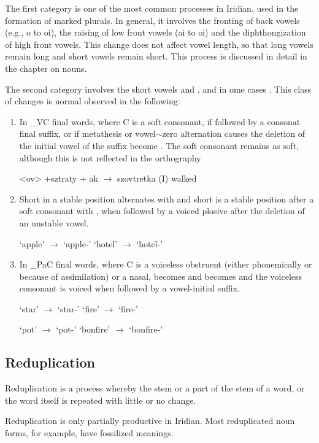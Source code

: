 The first category is one of the most common processes in Iridian, used in the formation of marked plurals. In general, it involves the fronting of back vowels (e.g., o to oi), the raising of low front vowels (ai to oi) and the diphthongization of high front vowels. This change does not affect vowel length, so that long vowels remain long and short vowels remain short. This process is discussed in detail in the chapter on nouns.

The second category involves the short vowels  and , and in ome cases . This class of changes is normal observed in the following:

\begin{enumerate}
	\item In \_VC final words, where C is a soft consonant, if followed by a consonat final suffix, or if metathesis or vowel$\sim$zero alternation causes the deletion of the initial vowel of the suffix  become . The soft consonant remains as soft, although this is not reflected in the orthography

		\pex
	\a <ov> +sztraty + ak $\rightarrow$ szovtretka (I) walked
	\xe
	\item Short  in a stable position alternates with  and short  is a stable position after a soft consonant with , when followed by a voiced plosive after the deletion of an unstable vowel.

	\pex
	\a {} `apple' $\rightarrow$  `apple-'
	\a {} `hotel' $\rightarrow$  `hotel-'
	\xe

	\item In \_PaC final words, where C is a voiceless obstruent (either phonemically or because of assimilation) or a nasal,  becomes  and  becomes  and the voiceless consonant is voiced when followed by a vowel-initial suffix.

		\pex
	\a {} `star' $\rightarrow$  `star-'
	\a {} `fire' $\rightarrow$  `fire-'
	\xe

	\pex
	\a {} `pot' $\rightarrow$  `pot-'
	\a {} `bonfire' $\rightarrow$  `bonfire-'
	\xe

\end{enumerate}



\subsection{Reduplication}
\par Reduplication is a process whereby the stem or a part of the stem of a word, or the word itself is repeated with little or no change.
\par Reduplication is only partially productive in Iridian. Most reduplicated noun forms, for example, have fossilized meanings.

